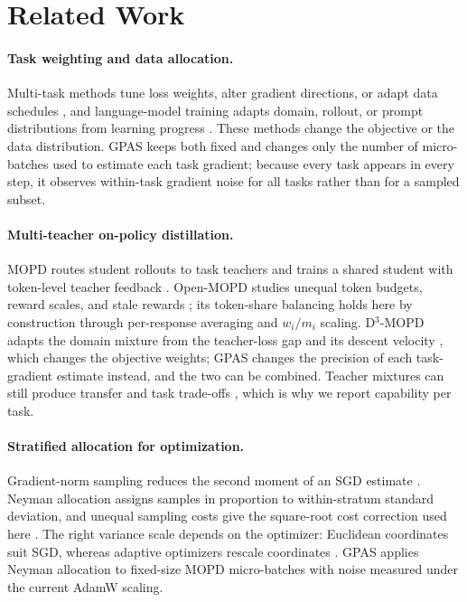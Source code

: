 \section{Related Work}

\paragraph{Task weighting and data allocation.}
Multi-task methods tune loss weights, alter gradient directions, or adapt data
schedules
\citep{sener2019multitasklearningmultiobjectiveoptimization,
yu2020gradientsurgerymultitasklearning,
liu2024conflictaversegradientdescentmultitask,chen2018gradnorm}, and
language-model training adapts domain, rollout, or prompt distributions from
learning progress
\citep{albalak2023efficient,wang2025dump,zheng2025greso,gao2025promptcurriculum}.
These methods change the objective or the data distribution. GPAS keeps both
fixed and changes only the number of micro-batches used to estimate each task
gradient; because every task appears in every step, it observes within-task
gradient noise for all tasks rather than for a sampled subset.

\paragraph{Multi-teacher on-policy distillation.}
MOPD routes student rollouts to task teachers and trains a shared student with
token-level teacher feedback \citep{ma2026mopdmultiteacheronpolicydistillation}.
Open-MOPD studies unequal token budgets, reward scales, and stale rewards
\citep{gao2026openmopddiagnosingfixingcapability}; its token-share balancing
holds here by construction through per-response averaging and $w_i/m_i$
scaling. D$^3$-MOPD adapts the domain mixture from the teacher-loss gap and
its descent velocity \citep{sun2026d3mopd}, which changes the objective
weights; GPAS changes the precision of each task-gradient estimate instead,
and the two can be combined. Teacher mixtures can still produce transfer and
task trade-offs \citep{li2026coinsidesdualnature}, which is why we report
capability per task.

\paragraph{Stratified allocation for optimization.}
Gradient-norm sampling reduces the second moment of an SGD estimate
\citep{alain2015variancereductionsgddistributed,
katharopoulos2018samplescreatedequaldeep}. Neyman allocation assigns samples
in proportion to within-stratum standard deviation, and unequal sampling costs
give the square-root cost correction used here
\citep{neyman1934representative,cochran1977sampling,mohri2026costawarelearning}.
The right variance scale depends on the optimizer: Euclidean coordinates suit
SGD, whereas adaptive optimizers rescale coordinates
\citep{lahire2023nonuniformadaptive}. GPAS applies Neyman allocation to
fixed-size MOPD micro-batches with noise measured under the current AdamW
scaling.

